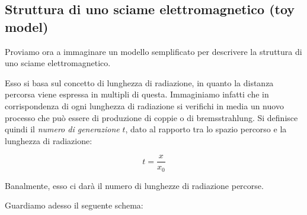 \subsection{Struttura di uno sciame elettromagnetico (toy model)}

Proviamo ora a immaginare un modello semplificato per descrivere la struttura di uno sciame elettromagnetico.

Esso si basa sul concetto di lunghezza di radiazione, in quanto la distanza percorsa viene espressa in multipli di questa. Immaginiamo infatti che in corrispondenza di ogni lunghezza di radiazione si verifichi in media un nuovo processo che può essere di produzione di coppie o di bremsstrahlung. Si definisce quindi il \textit{numero di generazione} $t$, dato al rapporto tra lo spazio percorso e la lunghezza di radiazione:

\begin{equation*}
    t=\frac{x}{x_0}
\end{equation*}

Banalmente, esso ci darà il numero di lunghezze di radiazione percorse.

Guardiamo adesso il seguente schema:


